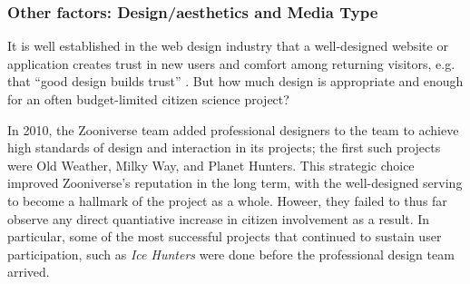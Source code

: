 \documentclass{sigchi}
\begin{document}
\subsubsection{Other factors: Design/aesthetics and Media Type}



It is well established in the web design industry that a well-designed website or application creates trust in new users and comfort among returning visitors, e.g. that ``good design builds trust'' \cite{norman}. But how much design is appropriate and enough for an often budget-limited citizen science project?   %

In 2010, the Zooniverse team added professional designers to the team to achieve high standards of design and interaction in its projects; the first such projects were Old Weather, Milky Way, and Planet Hunters.  This strategic choice improved Zooniverse's reputation in the long term, with the well-designed serving to become a hallmark of the project as a whole.  Howeer, they failed to thus far observe any direct quantiative increase in citizen involvement as a result.  In particular, some of the most successful projects that continued to sustain user participation, such as \emph{Ice Hunters} were done before the professional design team arrived.

\end{document}

